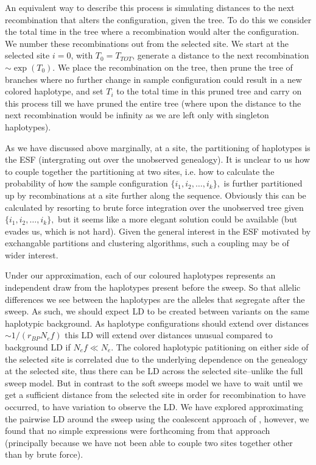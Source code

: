 \documentclass[a4paper,10pt]{article}
\begin{document}
An equivalent way to describe this process is simulating distances to the next recombination that alters the configuration, given the tree. To do this we consider the total time in the tree where a recombination would alter the configuration. We number these recombinations out from the selected site. We start at the selected site $i=0$, with $T_0 = T_{TOT}$, generate a distance to the next recombination $\sim \exp(T_0)$. We place the recombination on the tree, then prune the tree of branches where no further change in sample configuration could result in a new colored haplotype, and set $T_i$ to the total time in this pruned tree and carry on this process till we have pruned the entire tree (where upon the distance to the next recombination would be infinity as we are left only with singleton haplotypes). 

As we have discussed above marginally, at a site, the partitioning of haplotypes is the ESF (intergrating out over the unobserved genealogy). It is unclear to us how to couple together the partitioning at two sites, i.e. how to calculate the probability of  how the sample configuration $ \{i_1,i_2,\dots,i_k\},$ is further partitioned up by recombinations at a site further along the sequence. Obviously this can be calculated by resorting to brute force integration over the unobserved tree given $\{i_1,i_2,\dots,i_k\},$ but it seems like a more elegant solution could be available (but evades us, which is not hard). Given the general interest in the ESF motivated by exchangable partitions and clustering algorithms, such a coupling may be of wider interest. 
 
Under our approximation, each of our coloured haplotypes represents an independent draw from the haplotypes present before the sweep. So that allelic differences we see between the haplotypes are the alleles that segregate after the sweep. As such, we should expect LD to be created between variants on the same haplotypic background. As haplotype configurations should extend over distances $\sim 1/(r_{BP} N_e f)$ this LD will extend over distances unusual compared to background LD if $N_e f \ll N_e$. The colored haplotypic patitioning on either side of the selected site is correlated due to the underlying dependence on the genealogy at the selected site, thus there can be LD across the selected site--unlike the full sweep model. But in contrast to the soft sweeps model we have to wait until we get a sufficient distance from the selected site in order for recombination to have occurred, to have variation to observe the LD. We have explored approximating the pairwise LD around the sweep using the coalescent approach of \citet{McVean:2006ke}, however, we found that no simple expressions were forthcoming from that approach (principally because we have not been able to couple two sites together other than by brute force).
\end{document}
